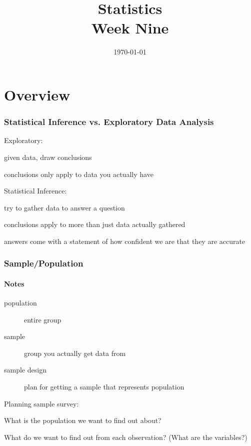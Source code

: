 \documentclass[landscape]{exam}
\title{Statistics \\ Week Nine}
\date{\today}
\author{}
\begin{document}
  \maketitle
  \tableofcontents

  \part{Overview}

  \section{Statistical Inference vs. Exploratory Data Analysis}
  
  Exploratory:
  \begin{itemize*}
    \item given data, draw conclusions
    \item conclusions only apply to data you actually have
  \end{itemize*}

  Statistical Inference:
  \begin{itemize*}
    \item try to gather data to answer a question
    \item conclusions apply to more than just data actually gathered
    \item answers come with a statement of how confident we are that they are
      accurate
  \end{itemize*}

  \section{Sample/Population}

  \subsection{Notes}
  \begin{description}
    \item[population] entire group
    \item[sample] group you actually get data from
    \item[sample design] plan for getting a sample that represents population
  \end{description}

  Planning sample survey:
  \begin{itemize*}
    \item What is the population we want to find out about? 
    \item What do we want to find out from each observation? (What are the variables?)
  \end{itemize*}
\end{document}
